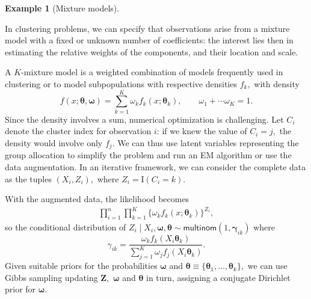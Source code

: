 \documentclass[
  11pt,
  letterpaper,
]{scrbook}
\theoremstyle{plain}
\theoremstyle{plain}
\theoremstyle{definition}
\theoremstyle{definition}
\theoremstyle{definition}
\newtheorem{example}{Example}[chapter]
\theoremstyle{plain}
\theoremstyle{remark}
\begin{document}
\begin{example}[Mixture
models]\protect\hypertarget{exm-mixture}{}\label{exm-mixture}

In clustering problems, we can specify that observations arise from a
mixture model with a fixed or unknown number of coefficients: the
interest lies then in estimating the relative weights of the components,
and their location and scale.

A \(K\)-mixture model is a weighted combination of models frequently
used in clustering or to model subpopulations with respective densities
\(f_k,\) with density
\[f(x; \boldsymbol{\theta}, \boldsymbol{\omega}) = \sum_{k=1}^K \omega_kf_k(x; \boldsymbol{\theta}_k), \qquad \omega_1 + \cdots \omega_K=1.\]
Since the density involves a sum, numerical optimization is challenging.
Let \(C_i\) denote the cluster index for observation \(i\): if we knew
the value of \(C_i =j,\) the density would involve only \(f_j.\) We can
thus use latent variables representing the group allocation to simplify
the problem and run an EM algorithm or use the data augmentation. In an
iterative framework, we can consider the complete data as the tuples
\((X_i, Z_i),\) where \(Z_i = \mathrm{I}(C_i=k).\)

With the augmented data, the likelihood becomes \begin{align*}
\prod_{i=1}^n \prod_{k=1}^K \{\omega_kf_k(x; \boldsymbol{\theta}_k)\}^{Z_i},
\end{align*} so the conditional distribution of
\(Z_i \mid X_i, \boldsymbol{\omega}, \boldsymbol{\theta} \sim \mathsf{multinom}(1, \boldsymbol{\gamma}_{ik})\)
where
\[\gamma_{ik} = \frac{\omega_k f_k(X_i\boldsymbol{\theta}_k)}{\sum_{j=1}^K \omega_jf_j(X_i\boldsymbol{\theta}_k)}.\]
Given suitable priors for the probabilities \(\boldsymbol{\omega}\) and
\(\boldsymbol{\theta} \equiv \{\boldsymbol{\theta}_1, \ldots, \boldsymbol{\theta}_k\},\)
we can use Gibbs sampling updating \(\boldsymbol{Z},\)
\(\boldsymbol{\omega}\) and \(\boldsymbol{\theta}\) in turn, assigning a
conjugate Dirichlet prior for \(\boldsymbol{\omega}.\)

\end{example}
\end{document}
